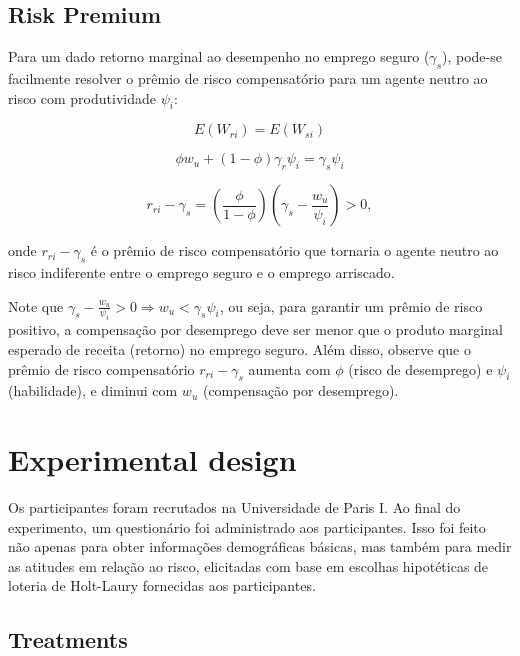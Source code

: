 \documentclass[a4paper,12pt]{article}[abntex2]
\begin{document}
\subsection{\textbf{Risk Premium}}

Para um dado retorno marginal ao desempenho no emprego seguro (\( \gamma_s \)), pode-se facilmente resolver o prêmio de risco compensatório para um agente neutro ao risco com produtividade \( \psi_i \):

\begin{equation}
E(W_{ri}) = E(W_{si})
\end{equation}

\begin{equation}
\phi w_u + (1 - \phi) \gamma_r \psi_i = \gamma_s \psi_i 
\end{equation}

\begin{equation}
r_{ri} - \gamma_s = \left( \frac{\phi}{1 - \phi} \right) \left( \gamma_s - \frac{w_u}{\psi_i} \right) > 0,
\end{equation}

onde \( r_{ri} - \gamma_s \) é o prêmio de risco compensatório que tornaria o agente neutro ao risco indiferente entre o emprego seguro e o emprego arriscado.

Note que \( \gamma_s - \frac{w_u}{\psi_i} > 0 \Rightarrow w_u < \gamma_s \psi_i \), ou seja, para garantir um prêmio de risco positivo, a compensação por desemprego deve ser menor que o produto marginal esperado de receita (retorno) no emprego seguro. Além disso, observe que o prêmio de risco compensatório \( r_{ri} - \gamma_s \) aumenta com \( \phi \) (risco de desemprego) e \( \psi_i \) (habilidade), e diminui com \( w_u \) (compensação por desemprego).


\section{\textbf{Experimental design}}

Os participantes foram recrutados na Universidade de Paris I. Ao final do experimento, um questionário foi administrado aos participantes. Isso foi feito não apenas para obter informações demográficas básicas, mas também para medir as atitudes em relação ao risco, elicitadas com base em escolhas hipotéticas de loteria de Holt-Laury fornecidas aos participantes.

\subsection{\textbf{Treatments}}
\end{document}
